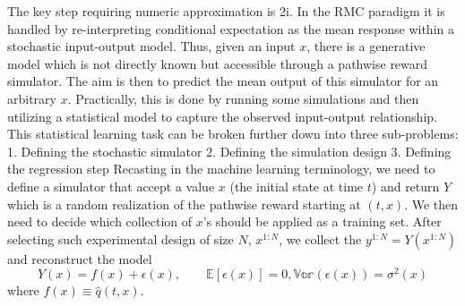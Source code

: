 \documentclass[]{article}
\begin{document}
The key step requiring numeric approximation is 2i. In the RMC paradigm
it is handled by re-interpreting conditional expectation as the mean
response within a stochastic input-output model. Thus, given an input
\(x\), there is a generative model which is not directly known but
accessible through a pathwise reward simulator. The aim is then to
predict the mean output of this simulator for an arbitrary \(x\).
Practically, this is done by running some simulations and then utilizing
a statistical model to capture the observed input-output relationship.
This statistical learning task can be broken further down into three
sub-problems: 1. Defining the stochastic simulator 2. Defining the
simulation design 3. Defining the regression step Recasting in the
machine learning terminology, we need to define a simulator that accept
a value \(x\) (the initial state at time \(t\)) and return \(Y\) which
is a random realization of the pathwise reward starting at \((t,x)\). We
then need to decide which collection of \(x\)'s should be applied as a
training set. After selecting such experimental design of size \(N\),
\(x^{1:N}\), we collect the \(y^{1:N} = Y(x^{1:N})\) and reconstruct the
model
\[ Y(x) = f(x) + \epsilon(x), \qquad \mathbb{E}[ \epsilon(x)] = 0, \mathbb{Var}(\epsilon(x)) = \sigma^2(x)\]
where \(f(x) \equiv \hat{q}(t,x)\).
\end{document}
